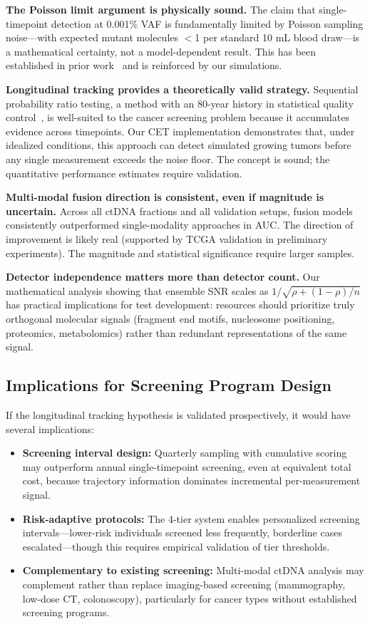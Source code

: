 \documentclass[10pt,a4paper]{article}
\begin{document}
\textbf{The Poisson limit argument is physically sound.} The claim that single-timepoint detection at 0.001\% VAF is fundamentally limited by Poisson sampling noise—with expected mutant molecules $<$1 per standard 10 mL blood draw—is a mathematical certainty, not a model-dependent result. This has been established in prior work~\cite{avanzini2020mathematical} and is reinforced by our simulations.

\textbf{Longitudinal tracking provides a theoretically valid strategy.} Sequential probability ratio testing, a method with an 80-year history in statistical quality control~\cite{wald1945sequential}, is well-suited to the cancer screening problem because it accumulates evidence across timepoints. Our CET implementation demonstrates that, under idealized conditions, this approach can detect simulated growing tumors before any single measurement exceeds the noise floor. The concept is sound; the quantitative performance estimates require validation.

\textbf{Multi-modal fusion direction is consistent, even if magnitude is uncertain.} Across all ctDNA fractions and all validation setups, fusion models consistently outperformed single-modality approaches in AUC. The direction of improvement is likely real (supported by TCGA validation in preliminary experiments). The magnitude and statistical significance require larger samples.

\textbf{Detector independence matters more than detector count.} Our mathematical analysis showing that ensemble SNR scales as $1/\sqrt{\rho + (1-\rho)/n}$ has practical implications for test development: resources should prioritize truly orthogonal molecular signals (fragment end motifs, nucleosome positioning, proteomics, metabolomics) rather than redundant representations of the same signal.

\subsection{Implications for Screening Program Design}

If the longitudinal tracking hypothesis is validated prospectively, it would have several implications:

\begin{itemize}
\item \textbf{Screening interval design:} Quarterly sampling with cumulative scoring may outperform annual single-timepoint screening, even at equivalent total cost, because trajectory information dominates incremental per-measurement signal.
\item \textbf{Risk-adaptive protocols:} The 4-tier system enables personalized screening intervals—lower-risk individuals screened less frequently, borderline cases escalated—though this requires empirical validation of tier thresholds.
\item \textbf{Complementary to existing screening:} Multi-modal ctDNA analysis may complement rather than replace imaging-based screening (mammography, low-dose CT, colonoscopy), particularly for cancer types without established screening programs.
\end{itemize}
\end{document}
